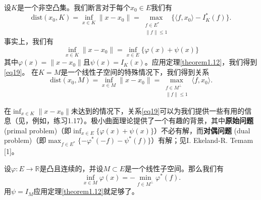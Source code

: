 \begin{example}
    设$K$是一个非空凸集。我们断言对于每个$x_0 \in E$我们有
\begin{equation}\label{eq19}
\text{dist}(x_0, K) = \inf_{x \in K} \|x-x_0\| = \max_{\substack{f \in E^* \\ \|f\| \leq 1}} \{\langle f, x_0 \rangle - I_K^*(f)\}.
\end{equation}
事实上，我们有
\[ \inf_{x \in K} \|x-x_0\| = \inf_{x \in E} \{\varphi(x) + \psi(x)\} \]
其中$\varphi(x) = \|x-x_0\|$且$\psi(x) = I_K(x)$。应用定理\ref{theorem1.12}，我们得到\eqref{eq19}。
在$K=M$是一个线性子空间的特殊情况下，我们得到关系
\[ \text{dist}(x_0, M) = \inf_{x \in M} \|x-x_0\| = \max_{\substack{f \in M^\perp \\ \|f\| \leq 1}} \langle f, x_0 \rangle. \]

\begin{remark}
在$\inf_{x \in K} \|x-x_0\|$未达到的情况下，关系\eqref{eq19}可以为我们提供一些有用的信息（见，例如，练习1.17）。极小曲面理论提供了一个有趣的背景，其中\textbf{原始问题} (primal problem)（即$\inf_{x \in E} \{\varphi(x)+\psi(x)\}$）不必有解，而\textbf{对偶问题} (dual problem)（即$\max_{f \in E^*} \{-\varphi^*(-f)-\psi^*(f)\}$）有解；见I. Ekeland-R. Temam [1]。
\end{remark}
\end{example}

\begin{example}
    设$\varphi: E \to \mathbb{R}$是凸且连续的，并设$M \subset E$是一个线性子空间。那么我们有
\[ \inf_{x \in M} \varphi(x) = -\min_{f \in M^\perp} \varphi^*(f). \]
用$\psi=I_M$应用定理\ref{theorem1.12}就足够了。
\end{example}

